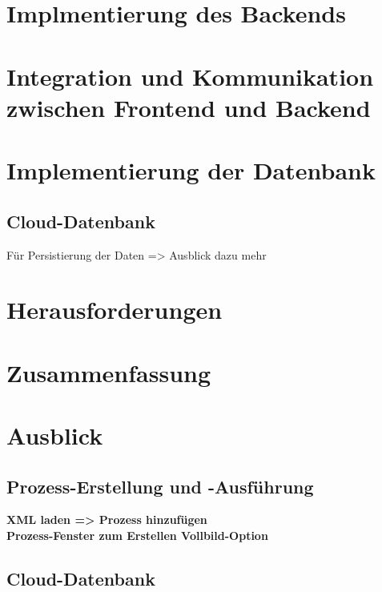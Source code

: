 \section{Implmentierung des Backends}


\section{Integration und Kommunikation zwischen Frontend und Backend}

\section{Implementierung der Datenbank}
\subsection{Cloud-Datenbank}
Für Persistierung der Daten => Ausblick dazu mehr




\section{Herausforderungen}

\section{Zusammenfassung}

\section{Ausblick}
\subsection{Prozess-Erstellung und -Ausführung}
\textbf{XML laden => Prozess hinzufügen}\\
\textbf{Prozess-Fenster zum Erstellen Vollbild-Option}
\subsection{Cloud-Datenbank}


\fi